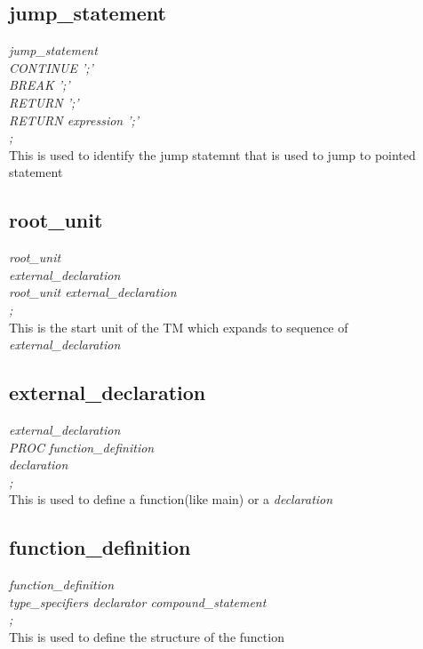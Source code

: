 \documentclass[11pt]{article}
\begin{document}
\subsection{jump\_statement}
{\itshape
jump\_statement\\
\hspace*{1cm} CONTINUE ';'\\
\hspace*{1cm}   BREAK ';'\\
\hspace*{1cm}   RETURN ';'\\
\hspace*{1cm}   RETURN expression ';'\\
\hspace*{1cm};\\
}
This is used to identify the jump statemnt that is used to jump to pointed statement
\subsection{root\_unit}
{\itshape
root\_unit\\
\hspace*{1cm} external\_declaration\\
\hspace*{1cm}   root\_unit external\_declaration\\
\hspace*{1cm};\\
}
This is the start unit of the TM which expands to sequence of \textit{external\_declaration}
\subsection{external\_declaration}
{\itshape
external\_declaration\\
\hspace*{1cm} PROC function\_definition\\
\hspace*{1cm}   declaration\\
\hspace*{1cm};\\
}
This is used to define a function(like main) or a \textit{declaration}
\subsection{function\_definition}
{\itshape
function\_definition\\
\hspace*{1cm} type\_specifiers declarator compound\_statement\\
\hspace*{1cm};\\
}
This is used to define the structure of the function
\end{document}
